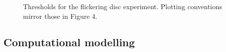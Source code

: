 \documentclass[
  letterpaper,
  DIV=11,
  numbers=noendperiod]{scrartcl}
\begin{document}
\begin{figure}


\caption{\label{fig-discdata}Thresholds for the flickering disc
experiment. Plotting conventions mirror those in Figure 4.}

\end{figure}%

\subsection{Computational modelling}\label{computational-modelling}
\end{document}
